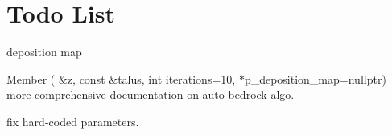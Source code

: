 \chapter{Todo List}
\hypertarget{todo}{}\label{todo}

\begin{DoxyRefList}
\item[Member \doxylink{namespacehmap_a2f83e2631c0b0dee67aae188f439f1bb}{hmap\+::sediment\+\_\+deposition} (\doxylink{classhmap_1_1Array}{Array} \&z, \doxylink{classhmap_1_1Array}{Array} \texorpdfstring{$\ast$}{*}p\+\_\+mask, const \doxylink{classhmap_1_1Array}{Array} \&talus, \doxylink{classhmap_1_1Array}{Array} \texorpdfstring{$\ast$}{*}p\+\_\+deposition\+\_\+map=nullptr, float max\+\_\+deposition=0.\+01, int iterations=5, int thermal\+\_\+subiterations=10)]\label{todo__todo000001}%
%
deposition map 
\item[Member \doxylink{namespacehmap_acbd2a3c82ec3ce4eaf77dbc92d580321}{hmap\+::thermal\+\_\+auto\+\_\+bedrock} (\doxylink{classhmap_1_1Array}{Array} \&z, const \doxylink{classhmap_1_1Array}{Array} \&talus, int iterations=10, \doxylink{classhmap_1_1Array}{Array} \texorpdfstring{$\ast$}{*}p\+\_\+deposition\+\_\+map=nullptr)]\label{todo__todo000002}%
%
more comprehensive documentation on auto-\/bedrock algo. 



fix hard-\/coded parameters.
\end{DoxyRefList}